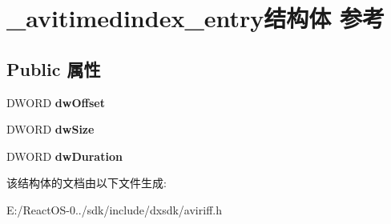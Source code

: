 \hypertarget{struct__avitimedindex__entry}{}\section{\+\_\+avitimedindex\+\_\+entry结构体 参考}
\label{struct__avitimedindex__entry}
\subsection*{Public 属性}
\begin{DoxyCompactItemize}
\item 
\mbox{\label{struct__avitimedindex__entry_a9ce6b7f6059d7716cd283d8137749511}} 
D\+W\+O\+RD {\bfseries dw\+Offset}
\item 
\mbox{\label{struct__avitimedindex__entry_a79567260b9be46be2f8589cac98127d9}} 
D\+W\+O\+RD {\bfseries dw\+Size}
\item 
\mbox{\label{struct__avitimedindex__entry_aa63bdcf35c8d5130a5d19da6165ff128}} 
D\+W\+O\+RD {\bfseries dw\+Duration}
\end{DoxyCompactItemize}


该结构体的文档由以下文件生成\+:\begin{DoxyCompactItemize}
\item 
E\+:/\+React\+O\+S-\/0../sdk/include/dxsdk/aviriff.\+h\end{DoxyCompactItemize}
